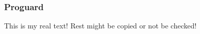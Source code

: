 \subsubsection{Proguard} \label{subsubsection:evaluation-reengineering-optobf-proguard}
This is my real text! Rest might be copied or not be checked!
